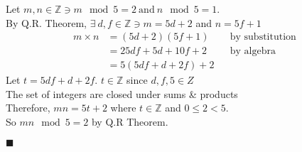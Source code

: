 \documentclass[12pt]{article}
\newcommand{\Z}{\mathbb{Z}}
\renewcommand{\qed}{\hfill$\blacksquare$}
\renewenvironment{proof}{\begin{addmargin}[1em]{0em}\begin{newproof}}{\end{newproof}\end{addmargin}\qed}
\begin{document}
\begin{proof}
	Let $m, n \in \Z \ni m \mod{5} = 2 \: \text{and} \: n \mod{5} = 1$. \\
	By Q.R. Theorem, $\exists \: d,f \in \Z \ni m = 5d+2$ and $n = 5f+1$
	\begin{align*}
		m \times n & = (5d+2)(5f+1)        &  & \text{by substitution} \\
		           & = 25df + 5d + 10f + 2 &  & \text{by algebra}      \\
		           & = 5(5df+d+2f) + 2
	\end{align*}
	Let $t = 5df+d+2f$. $t \in \Z$ since $d,f,5 \in Z$ \\
	The set of integers are closed under sums \& products \\
	Therefore, $mn = 5t + 2$ where $t \in \Z$ and $0 \le 2 < 5$. \\
	So $mn \mod{5} = 2 $ by Q.R Theorem.
\end{proof}

\end{document}
